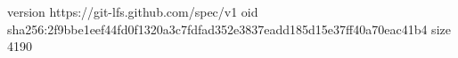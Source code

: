 version https://git-lfs.github.com/spec/v1
oid sha256:2f9bbe1eef44fd0f1320a3c7fdfad352e3837eadd185d15e37ff40a70eac41b4
size 4190
